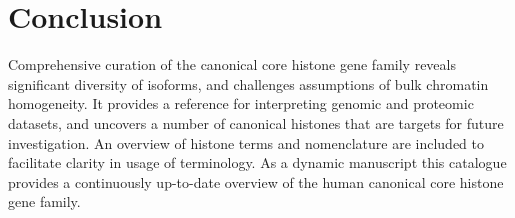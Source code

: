 \section{Conclusion}
\label{sec:conclusion}

  Comprehensive curation of the canonical core histone gene family
  reveals significant diversity of isoforms,
  and challenges assumptions of bulk chromatin homogeneity.
  It provides a reference for interpreting genomic and proteomic datasets,
  and uncovers a number of canonical histones that are targets for future investigation.
  An overview of histone terms and nomenclature
  are included to facilitate clarity in usage of terminology.
  As a dynamic manuscript this catalogue provides a continuously up-to-date overview
  of the human canonical core histone gene family.
